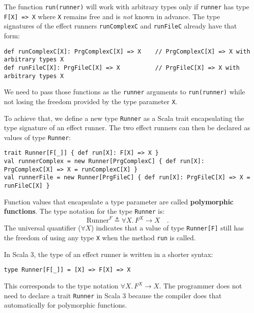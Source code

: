The function \lstinline!run(runner)!
will work with arbitrary types only if \lstinline!runner!
has type \lstinline!F[X] => X!
where \lstinline!X! remains
free and is \emph{not} known in advance. The type signatures of the
effect runners \lstinline!runComplexC!
and \lstinline!runFileC!
already have that form:
\begin{lstlisting}
def runComplexC[X]: PrgComplexC[X] => X    // PrgComplexC[X] => X with arbitrary types X
def runFileC[X]: PrgFileC[X] => X          // PrgFileC[X] => X with arbitrary types X
\end{lstlisting}
We need to pass those functions as the \lstinline!runner!
arguments to \lstinline!run(runner)!
while not losing the freedom provided by the type parameter \lstinline!X!. 

To achieve that, we define a new type \lstinline!Runner!
as a Scala trait encapsulating the type signature of an effect runner.
The two effect runners can then be declared as values of type \lstinline!Runner!:
\begin{lstlisting}
trait Runner[F[_]] { def run[X]: F[X] => X }
val runnerComplex = new Runner[PrgComplexC] { def run[X]: PrgComplexC[X] => X = runComplexC[X] }
val runnerFile = new Runner[PrgFileC] { def run[X]: PrgFileC[X] => X = runFileC[X] } 
\end{lstlisting}
Function values that encapsulate a type parameter are called \textbf{polymorphic
functions}. The type notation for the
type \lstinline!Runner!
is:
\[
\text{Runner}^{F}\triangleq\forall X.\,F^{X}\rightarrow X\quad.
\]
The universal quantifier ($\forall X$) indicates that a value of
type \lstinline!Runner[F]!
still has the freedom of using any type \lstinline!X!
when the method \lstinline!run!
is called.

In Scala 3, the type of an effect runner is written in a shorter syntax:
\begin{lstlisting}
type Runner[F[_]] = [X] => F[X] => X
\end{lstlisting}
This corresponds to the type notation $\forall X.\,F^{X}\rightarrow X$.
The programmer does not need to declare a trait \lstinline!Runner!
in Scala 3 because the compiler does that automatically for polymorphic
functions.


